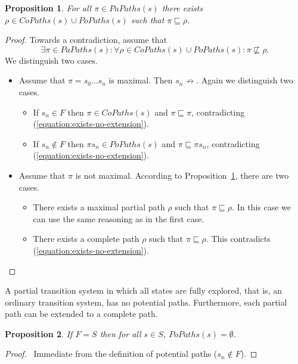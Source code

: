 \documentclass[12pt]{article}
\newtheorem{proposition}{Proposition}
\theoremstyle{definition}
\newenvironment{franck}{\color{red}}{\color{black}}
\begin{document}
\begin{franck}
\begin{proposition}
\label{proposition:partial-path-extension}
For all $\pi \in \mathit{PaPaths}(s)$ there exists $\rho \in \mathit{CoPaths}(s) \cup \mathit{PoPaths}(s)$ such that $\pi \sqsubseteq \rho$.
\end{proposition}
\begin{proof}
Towards a contradiction, assume that 
\begin{equation}
\label{equation:exists-no-extension}
\exists \pi \in \mathit{PaPaths}(s) : \forall \rho \in \mathit{CoPaths}(s) \cup \mathit{PoPaths}(s) : \pi \not\sqsubseteq \rho.
\end{equation}
We distinguish two cases.
\begin{itemize}
\item 
Assume that $\pi = s_0 \ldots s_n$ is maximal.  Then $s_n \not\rightarrow$.  Again we distinguish two cases.
\begin{itemize}
\item 
If $s_n \in F$ then $\pi \in \mathit{CoPaths}(s)$ and $\pi \sqsubseteq \pi$, contradicting (\ref{equation:exists-no-extension}).
\item
If $s_n \not\in F$ then $\pi s_n \in \mathit{PoPaths}(s)$ and $\pi \sqsubseteq \pi s_n$, contradicting (\ref{equation:exists-no-extension}).
\end{itemize}
\item
Assume that $\pi$ is not maximal. According to Proposition~\ref{proposition:partial-path-extension}, there are two cases.
\begin{itemize}
\item 
There exists a maximal partial path $\rho$ such that $\pi \sqsubseteq \rho$.  In this case we can use the same reasoning as in the first case.
\item
There exists a complete path $\rho$ such that $\pi \sqsubseteq \rho$.  This contradicts (\ref{equation:exists-no-extension}). 
\end{itemize} 
\end{itemize}
\end{proof}
\end{franck}

A partial transition system in which all states are fully explored, that is, an ordinary transition system, has no potential paths.  Furthermore, each partial path can be extended to a complete path.

\begin{proposition}
\label{proposition:no-potential-paths}
If $F= S$ then for all $s \in S$, $\mathit{PoPaths}(s) = \emptyset$.
\end{proposition}
\begin{proof}\ 
Immediate from the definition of potential paths ($s_n \not\in F$).
\end{proof}
\end{document}
